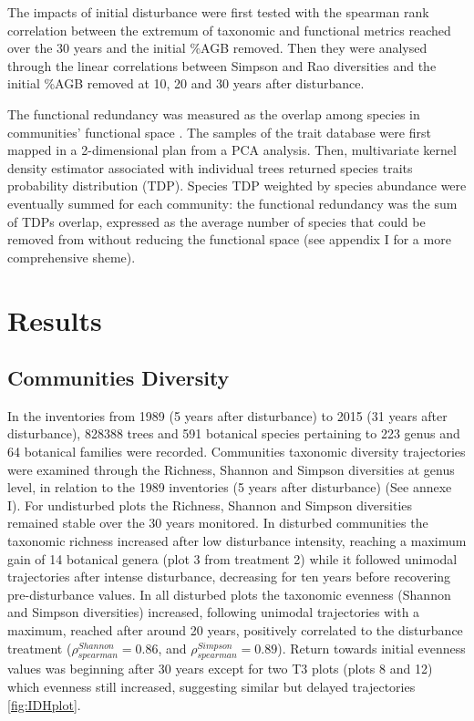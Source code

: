 \documentclass[fleqn,10pt]{ArtEcoFoG} %
\theoremstyle{definition}
\theoremstyle{definition}
\theoremstyle{definition}
\theoremstyle{remark}
\begin{document}
The impacts of initial disturbance were first tested with the spearman
rank correlation between the extremum of taxonomic and functional
metrics reached over the 30 years and the initial \%AGB removed. Then
they were analysed through the linear correlations between Simpson and
Rao diversities and the initial \%AGB removed at 10, 20 and 30 years
after disturbance.

The functional redundancy was measured as the overlap among species in
communities' functional space \citep{Carmona2016}. The samples of the
trait database were first mapped in a 2-dimensional plan from a PCA
analysis. Then, multivariate kernel density estimator associated with
individual trees returned species traits probability distribution (TDP).
Species TDP weighted by species abundance were eventually summed for
each community: the functional redundancy was the sum of TDPs overlap,
expressed as the average number of species that could be removed from
without reducing the functional space (see appendix I for a more
comprehensive sheme).

\section{Results}\label{results}

\subsection{Communities Diversity}\label{communities-diversity}

In the inventories from 1989 (5 years after disturbance) to 2015 (31
years after disturbance), 828388 trees and 591 botanical species
pertaining to 223 genus and 64 botanical families were recorded.
Communities taxonomic diversity trajectories were examined through the
Richness, Shannon and Simpson diversities at genus level, in relation to
the 1989 inventories (5 years after disturbance) (See annexe I). For
undisturbed plots the Richness, Shannon and Simpson diversities remained
stable over the 30 years monitored. In disturbed communities the
taxonomic richness increased after low disturbance intensity, reaching a
maximum gain of 14 botanical genera (plot 3 from treatment 2) while it
followed unimodal trajectories after intense disturbance, decreasing for
ten years before recovering pre-disturbance values. In all disturbed
plots the taxonomic evenness (Shannon and Simpson diversities)
increased, following unimodal trajectories with a maximum, reached after
around 20 years, positively correlated to the disturbance treatment
(\(\rho_{spearman}^{Shannon}=0.86\), and
\(\rho_{spearman}^{Simpson}=0.89\)). Return towards initial evenness
values was beginning after 30 years except for two T3 plots (plots 8 and
12) which evenness still increased, suggesting similar but delayed
trajectories \ref{fig:IDHplot}.
\end{document}
